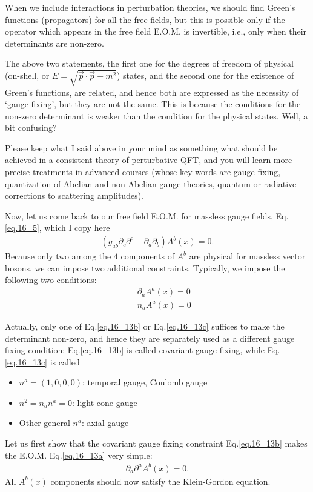 \documentclass[12pt]{article}
\def\del{{\partial}}
\begin{document}
When we include interactions in perturbation theories, we should find
Green's functions (propagators) for all the free fields, but this is
possible only if the operator which appears in the free field E.O.M.
is invertible, i.e., only when their determinants are non-zero.

The above two statements, the first one for the degrees of freedom
of physical (on-shell, or $E = \sqrt{ {\vec p} \cdot {\vec p} + m^2 }$) states,
and the second one for the existence of Green's functions, are
related, and hence both are expressed as the necessity of
`gauge fixing', but they are not the same.  This is because the
conditions for the non-zero determinant is weaker than the condition
for the physical states.  Well, a bit confusing?

Please keep what I said above in your mind as something what should
be achieved in a consistent theory of perturbative QFT, and you will
learn more precise treatments in advanced courses (whose key words
are gauge fixing, quantization of Abelian and non-Abelian gauge
theories, quantum or radiative corrections to scattering amplitudes).

Now, let us come back to our free field E.O.M. for massless gauge
fields, Eq.\ref{eq.16_5}, which I copy here
\begin{eqnarray}
  (g_{ab} \del_c \del^c -\del_a \del_b) A^b(x) = 0. \label{eq.16_13a}
\end{eqnarray}
Because only two among the $4$ components of $A^b$ are physical for
massless vector bosons, we can impose two additional constraints.
Typically, we impose the following two conditions:
\begin{eqnarray}
  && \del_a A^a(x) = 0 \label{eq.16_13b} \\
  && n_a A^a(x) = 0 \label{eq.16_13c}
\end{eqnarray}

Actually, only one of Eq.\ref{eq.16_13b} or Eq.\ref{eq.16_13c} suffices to make the determinant non-zero, and hence they are separately used as a different gauge fixing condition: Eq.\ref{eq.16_13b} is called covariant gauge fixing, while Eq.\ref{eq.16_13c} is called
\begin{itemize}
  \item $n^a = (1,0,0,0)$: temporal gauge, Coulomb gauge
  \item $n^2 = n_a n^a = 0$: light-cone gauge
  \item Other general $n^a$: axial gauge
\end{itemize}
Let us first show that the covariant gauge fixing constraint Eq.\ref{eq.16_13b}
makes the E.O.M. Eq.\ref{eq.16_13a} very simple:
\begin{eqnarray}
  \del_a \del^a A^b(x) = 0. \label{eq.16_15}
\end{eqnarray}
All $A^b(x)$ components should now satisfy the Klein-Gordon equation.
\end{document}
